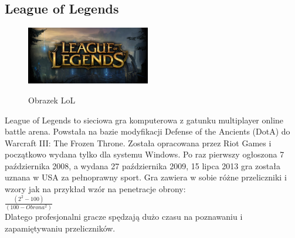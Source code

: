 \documentclass{article}
\begin{document}
\subsection{League of Legends}
\begin{figure}
\begin{center}
\vspace{-20pt}
\label{rys2}
\includegraphics[width=0.48\textwidth]{lol}
\caption[Obrazek LoL]{Obrazek LoL}
\end{center}
\vspace{-20pt}
\vspace{-10pt}
\end{figure}
League of Legends to sieciowa gra komputerowa z gatunku multiplayer online battle arena. Powstała na bazie modyfikacji Defense of the Ancients (DotA) do Warcraft III: The Frozen Throne. Została opracowana przez Riot Games i początkowo wydana tylko dla systemu Windows. Po raz pierwszy ogłoszona 7 października 2008, a wydana 27 października 2009, 15 lipca 2013 gra została uznana w USA za pełnoprawny sport. Gra zawiera w sobie różne przeliczniki i wzory jak na przykład wzór na penetracje obrony:\\
\begin{math}
\frac{ (2^2-100) }{ (100-Obrona^2) }\quad
\label{eq:1}
\end{math}\\
Dlatego profesjonalni gracze spędzają dużo czasu na poznawaniu i zapamiętywaniu przeliczników.
\end{document}
